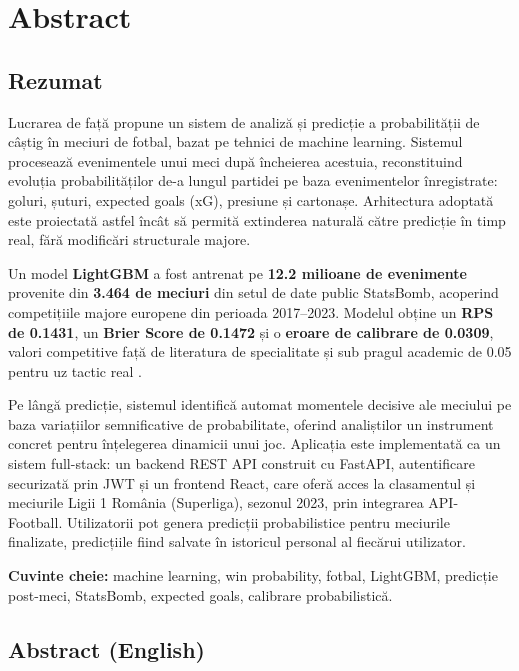 \chapter*{Abstract}
\section*{Rezumat}

Lucrarea de față propune un sistem de analiză și predicție a probabilității
de câștig în meciuri de fotbal, bazat pe tehnici de machine learning. Sistemul
procesează evenimentele unui meci după încheierea acestuia, reconstituind
evoluția probabilităților de-a lungul partidei pe baza evenimentelor
înregistrate: goluri, șuturi, expected goals (xG), presiune și cartonașe.
Arhitectura adoptată este proiectată astfel încât să permită extinderea
naturală către predicție în timp real, fără modificări structurale majore.

Un model \textbf{LightGBM} a fost antrenat pe \textbf{12.2 milioane de
evenimente} provenite din \textbf{3.464 de meciuri} din setul de date public
StatsBomb, acoperind competițiile majore europene din perioada 2017--2023.
Modelul obține un \textbf{RPS de 0.1431}, un \textbf{Brier Score de 0.1472}
și o \textbf{eroare de calibrare de 0.0309}, valori competitive față de
literatura de specialitate și sub pragul academic de 0.05 pentru uz tactic
real \cite{Robberechts2019}.

Pe lângă predicție, sistemul identifică automat momentele decisive ale
meciului pe baza variațiilor semnificative de probabilitate, oferind
analiștilor un instrument concret pentru înțelegerea dinamicii unui joc.
Aplicația este implementată ca un sistem full-stack: un backend REST API
construit cu FastAPI, autentificare securizată prin JWT și un frontend React,
care oferă acces la clasamentul și meciurile Ligii 1 România (Superliga),
sezonul 2023, prin integrarea API-Football. Utilizatorii pot genera predicții
probabilistice pentru meciurile finalizate, predicțiile fiind salvate în
istoricul personal al fiecărui utilizator.

\bigskip
\noindent\textbf{Cuvinte cheie:} machine learning, win probability, fotbal,
LightGBM, predicție post-meci, StatsBomb, expected goals, calibrare
probabilistică.

\section*{Abstract (English)}

